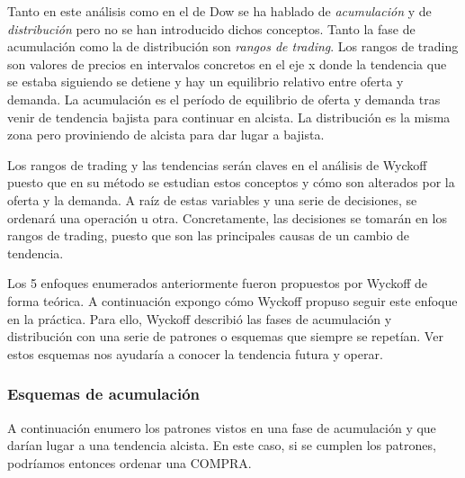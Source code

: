 Tanto en este análisis como en el de Dow se ha hablado de \textit{acumulación} y de \textit{distribución} pero no se han introducido dichos conceptos. Tanto la fase de acumulación como la de distribución son \textit{rangos de trading}. Los rangos de trading son valores de precios en intervalos concretos en el eje x donde la tendencia que se estaba siguiendo se detiene y hay un equilibrio relativo entre oferta y demanda. La acumulación es el período de equilibrio de oferta y demanda tras venir de tendencia bajista para continuar en alcista. La distribución es la misma zona pero proviniendo de alcista para dar lugar a bajista. \newline

Los rangos de trading y las tendencias serán claves en el análisis de Wyckoff puesto que en su método se estudian estos conceptos y cómo son alterados por la oferta y la demanda. A raíz de estas variables y una serie de decisiones, se ordenará una operación u otra. Concretamente, las decisiones se tomarán en los rangos de trading, puesto que son las principales causas de un cambio de tendencia. \newline

Los 5 enfoques enumerados anteriormente fueron propuestos por Wyckoff de forma teórica. A continuación expongo cómo Wyckoff propuso seguir este enfoque en la práctica. Para ello, Wyckoff describió las fases de acumulación y distribución con una serie de patrones o esquemas que siempre se repetían. Ver estos esquemas nos ayudaría a conocer la tendencia futura y operar.

\subsubsection{Esquemas de acumulación}

A continuación enumero los patrones vistos en una fase de acumulación y que darían lugar a una tendencia alcista. En este caso, si se cumplen los patrones, podríamos entonces ordenar una COMPRA.

